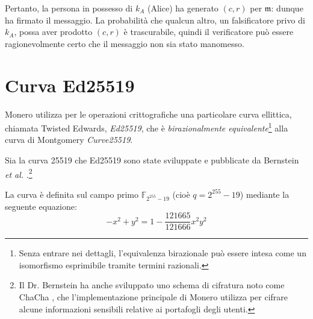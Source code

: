Pertanto, la persona in possesso di $k_A$ (Alice) ha generato $(c, r)$ per $\mathfrak{m}$: dunque ha firmato il messaggio. La probabilità che qualcun altro, un falsificatore privo di $k_A$, possa aver prodotto $(c, r)$ è trascurabile, quindi il verificatore può essere ragionevolmente certo che il messaggio non sia stato manomesso.



\section{Curva Ed25519}
\label{Ed25519_section}

Monero utilizza per le operazioni crittografiche una particolare curva ellittica, chiamata Twisted Edwards, {\em Ed25519}, che è {\em birazionalmente equivalente}\footnote{\label{birational_note}Senza entrare nei dettagli, l'equivalenza birazionale può essere intesa come un isomorfismo esprimibile tramite termini razionali.} 
alla curva di Montgomery {\em Curve25519}.

Sia la curva 25519 che Ed25519 sono state sviluppate e pubblicate da Bernstein {\em et al.} \cite{Bernstein2008, Bernstein2012, Bernstein2007}.\footnote{Il Dr. Bernstein ha anche sviluppato uno schema di cifratura noto come ChaCha \cite{Bernstein_chacha,chacha-irtf}, che l’implementazione principale di Monero utilizza per cifrare alcune informazioni sensibili relative ai portafogli degli utenti.}

La curva è definita sul campo primo \(\mathbb{F}_{2^{255} - 19}\) (cioè $q = 2^{255}-19$) mediante la seguente equazione:\vspace{.175cm}
\[-x^2 + y^2 = 1 - \frac{121665}{121666} x^2 y^2\]

